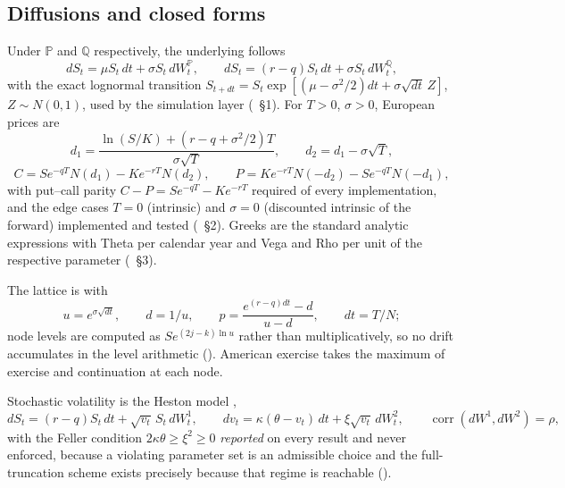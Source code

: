 \documentclass[11pt,a4paper]{article}
\begin{document}
\subsection{Diffusions and closed forms}
Under $\mathbb{P}$ and $\mathbb{Q}$ respectively, the underlying follows
\begin{equation}
dS_t = \mu S_t\,dt + \sigma S_t\,dW_t^{\mathbb{P}}, \qquad
dS_t = (r-q) S_t\,dt + \sigma S_t\,dW_t^{\mathbb{Q}},
\end{equation}
with the exact lognormal transition $S_{t+dt} = S_t \exp[(\mu - \sigma^2/2)dt +
\sigma\sqrt{dt}\,Z]$, $Z \sim N(0,1)$, used by the simulation layer
(~\S1). For $T>0$, $\sigma>0$, European prices are
\citep{black1973pricing}
\begin{equation}
d_1 = \frac{\ln(S/K) + (r - q + \sigma^2/2)T}{\sigma\sqrt{T}}, \qquad d_2 = d_1 - \sigma\sqrt{T},
\end{equation}
\begin{equation}
C = S e^{-qT} N(d_1) - K e^{-rT} N(d_2), \qquad
P = K e^{-rT} N(-d_2) - S e^{-qT} N(-d_1),
\end{equation}
with put--call parity $C - P = S e^{-qT} - K e^{-rT}$ required of every implementation, and
the edge cases $T = 0$ (intrinsic) and $\sigma = 0$ (discounted intrinsic of the forward)
implemented and tested (~\S2). Greeks are the
standard analytic expressions with Theta per calendar year and Vega and Rho per unit of the
respective parameter (~\S3).

The lattice is \citep{cox1979binomial} with
\begin{equation}
u = e^{\sigma\sqrt{dt}}, \qquad d = 1/u, \qquad
p = \frac{e^{(r-q)dt} - d}{u - d}, \qquad dt = T/N;
\end{equation}
node levels are computed as $S e^{(2j-k)\ln u}$ rather than multiplicatively, so no drift
accumulates in the level arithmetic ().
American exercise takes the maximum of exercise and continuation at each node.

Stochastic volatility is the Heston model \citep{heston1993closed},
\begin{equation}
dS_t = (r-q) S_t\,dt + \sqrt{v_t}\,S_t\,dW_t^{1}, \qquad
dv_t = \kappa(\theta - v_t)\,dt + \xi \sqrt{v_t}\,dW_t^{2}, \qquad
\operatorname{corr}(dW^{1}, dW^{2}) = \rho,
\end{equation}
with the Feller condition $2\kappa\theta \ge \xi^2 \geq 0$ \emph{reported} on every result and
never enforced, because a violating parameter set is an admissible choice and the
full-truncation scheme exists precisely because that regime is reachable
().
\end{document}
